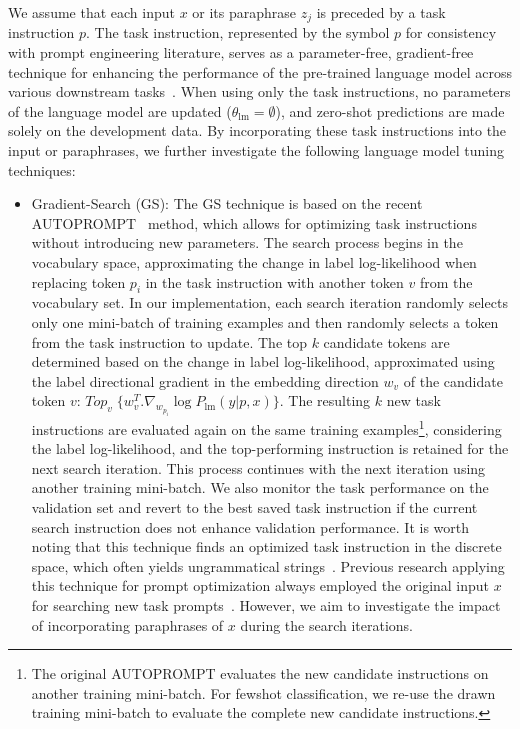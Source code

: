\documentclass[11pt]{article}
\begin{document}
We assume that each input $x$ or its paraphrase $z_j$ is preceded by a task instruction $p$. The task instruction, represented by the symbol $p$ for consistency with prompt engineering literature, serves as a parameter-free, gradient-free technique for enhancing the performance of the pre-trained language model across various downstream tasks~\cite{DBLP:journals/corr/abs-2005-14165, petroni-etal-2019-language, deng-etal-2022-rlprompt}. When using only the task instructions, no parameters of the language model are updated ($\theta_{\text{lm}}=\emptyset$), and zero-shot predictions are made solely on the development data. By incorporating these task instructions into the input or paraphrases, we further investigate the following language model tuning techniques:
\begin{itemize}

    \item Gradient-Search (GS): The GS technique is based on the recent AUTOPROMPT~\cite{shin-etal-2020-autoprompt} method, which allows for optimizing task instructions without introducing new parameters. The search process begins in the vocabulary space, approximating the change in label log-likelihood when replacing token $p_{i}$ in the task instruction with another token $v$ from the vocabulary set. In our implementation, each search iteration randomly selects only one mini-batch of training examples and then randomly selects a token from the task instruction to update. The top $k$ candidate tokens are determined based on the change in label log-likelihood, approximated using the label directional gradient in the embedding direction $w_v$ of the candidate token $v$: $Top_v \; \{w^{T}_{v} . \nabla_{w_{p_i}} \log P_{\text{lm}}(y|p,x)\}$. The resulting $k$ new task instructions are evaluated again on the same training examples\footnote{The original AUTOPROMPT evaluates the new candidate instructions on another training mini-batch. For fewshot classification, we re-use the drawn training mini-batch to evaluate the complete new candidate instructions.}, considering the label log-likelihood, and the top-performing instruction is retained for the next search iteration. This process continues with the next iteration using another training mini-batch. We also monitor the task performance on the validation set and revert to the best saved task instruction if the current search instruction does not enhance validation performance. It is worth noting that this technique finds an optimized task instruction in the discrete space, which often yields ungrammatical strings~\cite{shin-etal-2020-autoprompt}. Previous research applying this technique for prompt optimization always employed the original input $x$ for searching new task prompts~\cite{shin-etal-2020-autoprompt, deng-etal-2022-rlprompt}. However, we aim to investigate the impact of incorporating paraphrases of $x$ during the search iterations.



\end{itemize}
\end{document}
